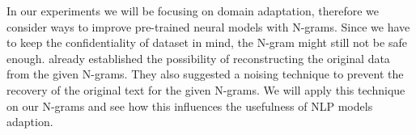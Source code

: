 
In our experiments we will be focusing on domain adaptation, therefore we consider ways to improve pre-trained neural models with N-grams. Since we have to keep the confidentiality of dataset in mind, the N-gram might still not be safe enough. \parencite{galle2015reconstructing} already established the possibility of reconstructing the original data from the given N-grams. They also suggested a noising technique to prevent the recovery of the original text for the given N-grams. We will apply this technique on our N-grams and see how this influences the usefulness of NLP models adaption.



